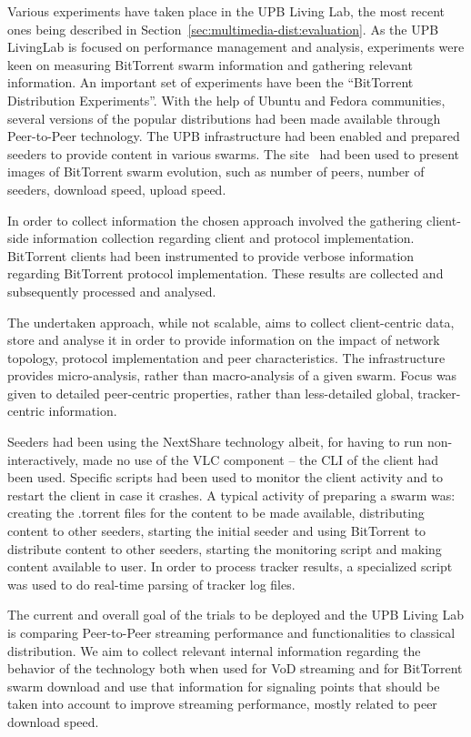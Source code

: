 Various experiments have taken place in the UPB Living Lab, the most recent
ones being described in Section~\ref{sec:multimedia-dist:evaluation}. As the UPB LivingLab
is focused on performance management and analysis, experiments were keen on
measuring BitTorrent swarm information and gathering relevant information. An
important set of experiments have been the ``BitTorrent Distribution
Experiments''. With the help of Ubuntu and Fedora communities, several
versions of the popular distributions had been made available through
Peer-to-Peer technology. The UPB infrastructure had been enabled and prepared
seeders to provide content in various swarms. The site~\cite{upb-livinglab} had been
used to present images of BitTorrent swarm evolution, such as number of peers,
number of seeders, download speed, upload speed.

In order to collect information the chosen approach involved the gathering
client-side information collection regarding client and protocol
implementation. BitTorrent clients had been instrumented to provide verbose
information regarding BitTorrent protocol implementation. These results are
collected and subsequently processed and analysed.

The undertaken approach, while not scalable, aims to collect client-centric
data, store and analyse it in order to provide information on the impact of
network topology, protocol implementation and peer characteristics. The
infrastructure provides micro-analysis, rather than macro-analysis of a given
swarm. Focus was given to detailed peer-centric properties, rather than
less-detailed global, tracker-centric information.

Seeders had been using the NextShare technology albeit, for having to run
non-interactively, made no use of the VLC component -- the CLI of the
client had been used. Specific scripts had been used to monitor the client
activity and to restart the client in case it crashes. A typical activity of
preparing a swarm was: creating the .torrent files for the content to be made
available, distributing content to other seeders, starting the initial seeder
and using BitTorrent to distribute content to other seeders, starting the
monitoring script and making content available to user. In order to process
tracker results, a specialized script was used to do real-time parsing of
tracker log files.

The current and overall goal of the trials to be deployed and the UPB Living
Lab is comparing Peer-to-Peer streaming performance and functionalities to
classical distribution. We aim to collect relevant internal information
regarding the behavior of the technology both when used for VoD streaming and
for BitTorrent swarm download and use that information for signaling points
that should be taken into account to improve streaming performance, mostly
related to peer download speed.

